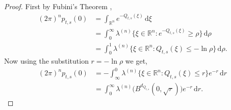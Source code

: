 \documentclass[a4paper, 12pt]{report}
\theoremstyle{cor}
\theoremstyle{remark}
\theoremstyle{definition}
\begin{document}
\begin{proof}
First by Fubini's Theorem \cite[Theorem 13.11]{FubiniBook},
\begin{align}
(2\pi)^np_{t, s}(0) & = \int_{\mathbb{R}^n}e^{-Q_{t, s}(\xi)}\,\mathrm{d}\xi\nonumber\\
& = \int_0^\infty\lambda^{(n)}\big\{\xi \in \mathbb{R}^n : e^{-Q_{t, s}(\xi)} \ge\rho\big\}\,\mathrm{d}\rho\nonumber\\
& = \int_0^1\lambda^{(n)}\big\{\xi \in \mathbb{R}^n : Q_{t, s}(\xi) \le -\ln\rho\big\}\,\mathrm{d}\rho\nonumber.
\end{align}
Now using the substitution $r = -\ln\rho$ we get,
\begin{align}
(2\pi)^np_{t, s}(0) & = -\int_\infty^0\lambda^{(n)}\big\{\xi \in \mathbb{R}^n : Q_{t, s}(\xi) \le r\big\}e^{-r}\,\mathrm{d}r\nonumber\\
& = \int_0^\infty\lambda^{(n)}\big(B^{d_{Q_{t, s}}}(0, \sqrt{r})\big)e^{-r}\,\mathrm{d}r.\nonumber
\end{align}


\end{proof}
\end{document}
